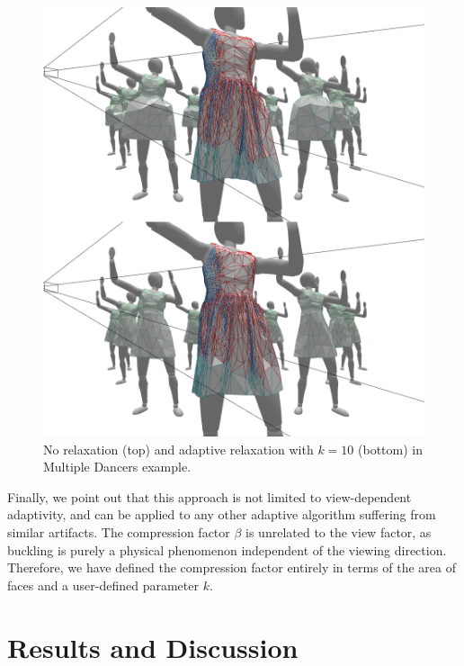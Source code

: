 \documentclass[10pt,journal,compsoc,twoside]{TexInputs/IEEEtran}
\begin{document}
\begin{figure}[t]
  \centering
  \includegraphics[width=1.0\columnwidth]{subelement_compression/no_vs_adaptive}
  \caption{No relaxation (top) and adaptive relaxation with $k = 10$ (bottom) in Multiple
  Dancers example.}
  \label{fig:no_vs_adaptive}
\end{figure}

Finally, we point out that this approach is not limited to view-dependent adaptivity, and can be applied to
any other adaptive algorithm suffering from similar artifacts.  The compression
factor $\beta$ is unrelated to the view factor, as buckling is purely a physical phenomenon independent of the viewing direction. Therefore, we have defined the compression factor
entirely in terms of the area of faces and a user-defined parameter $k$.


\section{Results and Discussion}
\end{document}
